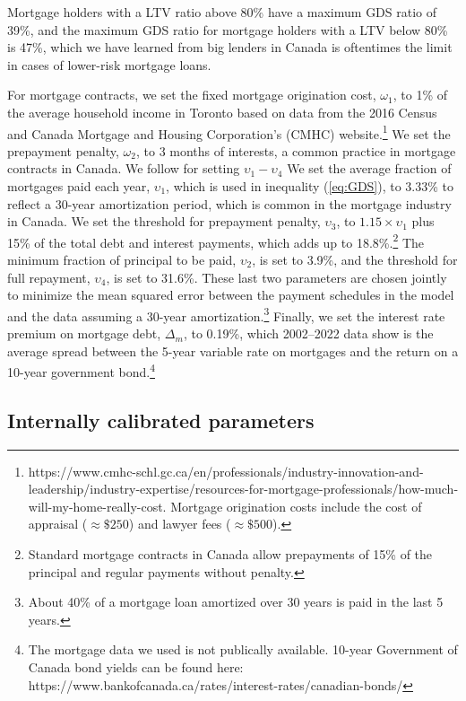 \documentclass[parskip=full]{article}
\begin{document}
\noindent Mortgage holders with a LTV ratio above 80\% have a maximum GDS ratio of 39\%, and the maximum GDS ratio for mortgage holders with a LTV below 80\% is 47\%, which we have learned from big lenders in Canada is oftentimes the limit in cases of lower-risk mortgage loans. 

For mortgage contracts, we set the fixed mortgage origination cost, $\omega_{1}$, to 1\% of the average household income in Toronto based on data from the 2016 Census and Canada Mortgage and Housing Corporation's (CMHC) website.\footnote{https://www.cmhc-schl.gc.ca/en/professionals/industry-innovation-and-leadership/industry-expertise/resources-for-mortgage-professionals/how-much-will-my-home-really-cost. Mortgage origination costs include the cost of appraisal ($\approx\$250$) and lawyer fees ($\approx\$500$).} We set the prepayment penalty, $\omega_{2}$, to 3 months of interests, a common practice in mortgage contracts in Canada. We follow \citet{rs-2023} for setting $\upsilon_{1}-\upsilon_{4}$ We set the average fraction of mortgages paid each year, $\upsilon_{1}$, which is used in inequality (\ref{eq:GDS}), to 3.33\% to reflect a 30-year amortization period, which is common in the mortgage industry in Canada. We set the threshold for prepayment penalty, $\upsilon_{3}$, to $1.15 \times \upsilon_{1}$ plus 15\% of the total debt and interest payments, which adds up to 18.8\%.\footnote{Standard mortgage contracts in Canada allow prepayments of 15\% of the principal and regular payments without penalty.} The minimum fraction of principal to be paid, $\upsilon_{2}$, is set to 3.9\%, and the threshold for full repayment, $\upsilon_{4}$, is set to 31.6\%. These last two parameters are chosen jointly to minimize the mean squared error between the payment schedules in the model and the data assuming a 30-year amortization.\footnote{About 40\% of a mortgage loan amortized over 30 years is paid in the last 5 years.} Finally, we set the interest rate premium on mortgage debt, $\Delta_{m}$, to 0.19\%, which 2002--2022 data show is the average spread between the 5-year variable rate on mortgages and the return on a 10-year government bond.\footnote{The mortgage data we used is not publically available. 10-year Government of Canada bond yields can be found here: https://www.bankofcanada.ca/rates/interest-rates/canadian-bonds/}

\subsection{Internally calibrated parameters}
\end{document}
